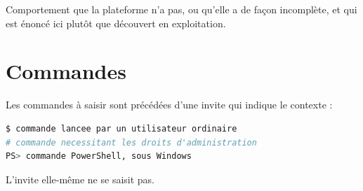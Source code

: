 \begin{tcolorbox}[colback=red!4!white, colframe=darkred,
  title=\textbf{Limitation connue}, fonttitle=\bfseries, boxrule=0.6pt]
Comportement que la plateforme n'a pas, ou qu'elle a de fa\c{c}on incompl\`ete,
et qui est \'enonc\'e ici plut\^ot que d\'ecouvert en exploitation.
\end{tcolorbox}

\section*{Commandes}

Les commandes \`a saisir sont pr\'ec\'ed\'ees d'une invite qui indique le
contexte :

\begin{lstlisting}[language=bash]
$ commande lancee par un utilisateur ordinaire
# commande necessitant les droits d'administration
PS> commande PowerShell, sous Windows
\end{lstlisting}

L'invite elle-m\^eme ne se saisit pas.
